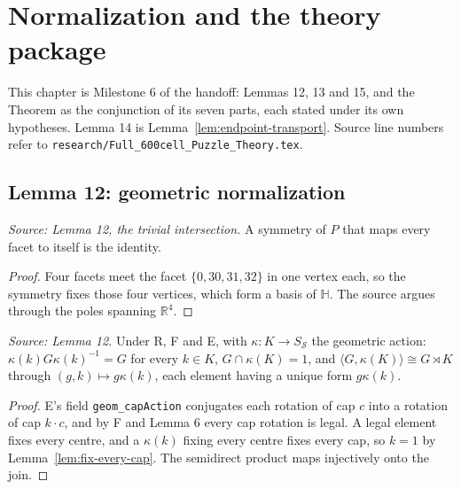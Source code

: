 \chapter{Normalization and the theory package}
\label{ch:ArchonFull600Theory_Package}

This chapter is Milestone 6 of the handoff: Lemmas 12, 13 and 15, and the
Theorem as the conjunction of its seven parts, each stated under its own
hypotheses. Lemma 14 is Lemma~\ref{lem:endpoint-transport}. Source line
numbers refer to \texttt{research/Full\_600cell\_Puzzle\_Theory.tex}.

\section{Lemma 12: geometric normalization}

\begin{lemma}
  \label{lem:fix-every-cap}
  \leanok
  \textit{Source: Lemma 12, the trivial intersection.}
  A symmetry of \(P\) that maps every facet to itself is the identity.
\end{lemma}
\begin{proof}
  \leanok
  Four facets meet the facet \(\{0,30,31,32\}\) in one vertex each, so the
  symmetry fixes those four vertices, which form a basis of \(\mathbb H\).
  The source argues through the poles spanning \(\mathbb R^4\).
\end{proof}

\begin{theorem}[Lemma 12]
  \label{thm:lemma-twelve}
  \leanok
  \textit{Source: Lemma 12.}
  Under R, F and E, with \(\kappa\colon K\to S_{\mathcal S}\) the geometric
  action: \(\kappa(k)G\kappa(k)^{-1}=G\) for every \(k\in K\),
  \(G\cap\kappa(K)=1\), and \(\langle G,\kappa(K)\rangle\cong G\rtimes K\)
  through \((g,k)\mapsto g\kappa(k)\), each element having a unique form
  \(g\kappa(k)\).
\end{theorem}
\begin{proof}
  \leanok
  E's field \texttt{geom\_capAction} conjugates each rotation of cap \(c\)
  into a rotation of cap \(k\cdot c\), and by F and Lemma 6 every cap
  rotation is legal. A legal element fixes every centre, and a
  \(\kappa(k)\) fixing every centre fixes every cap, so \(k=1\) by
  Lemma~\ref{lem:fix-every-cap}. The semidirect product maps injectively
  onto the join.
\end{proof}

